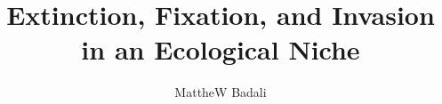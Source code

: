 \documentclass{ut-thesis}
\author{MattheW Badali}
\title{Extinction, Fixation, and Invasion in an Ecological Niche}
\begin{document}
\begin{preliminary}

\maketitle


\begin{abstract}



\iffalse
The famous ``paradox of the plankton'' points out that in some ecosystems there are more species than expected, given the principle of competitive exclusion, which states that in each ecological niche one species should outcompete all others, to their extinction and its fixation. 
Despite the importance of biodiversity in conservation biology and human health, the mechanisms of its maintenance as species invade and go extinct are poorly understood. 
Proposed theories of biodiversity are usually niche or neutral. 
Niche models like the Lotka-Volterra model typically show longer extinction times compared to neutral models like that of Moran. 
Recently, however, researchers have demonstrated that Moran-like dynamics are a limiting case of the Lotka-Volterra model with stochastic fluctuations. 
\fi


\end{abstract}
\end{preliminary}
\end{document}
